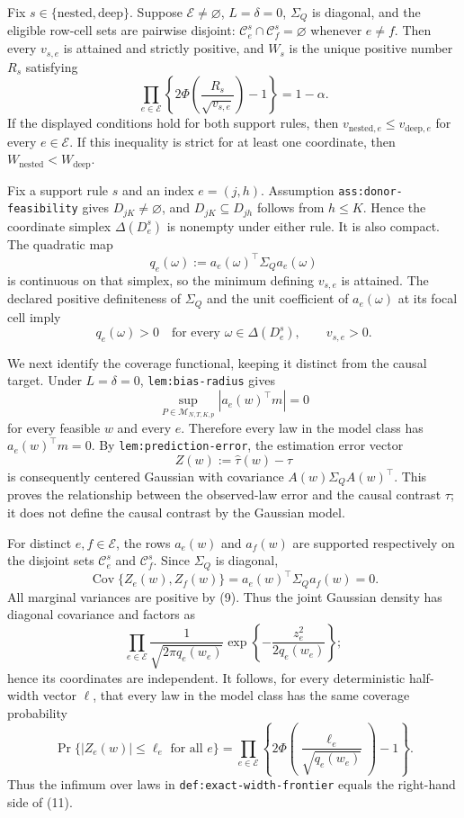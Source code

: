 Fix \(s\in\{\mathrm{nested},\mathrm{deep}\}\).  Suppose
\(\mathcal E\ne\varnothing\), \(L=\delta=0\), \(\Sigma_Q\) is diagonal, and
the eligible row-cell sets are pairwise disjoint:
\(\mathcal C^s_e\cap\mathcal C^s_f=\varnothing\) whenever \(e\ne f\).
Then every \(v_{s,e}\) is attained and strictly positive, and \(W_s\) is the
unique positive number \(R_s\) satisfying
\[
 \prod_{e\in\mathcal E}
 \left\{2\Phi\!\left(\frac{R_s}{\sqrt{v_{s,e}}}\right)-1\right\}
 =1-\alpha. \tag{8}
\]
If the displayed conditions hold for both support rules, then
\(v_{\mathrm{nested},e}\leq v_{\mathrm{deep},e}\) for every
\(e\in\mathcal E\).  If this inequality is strict for at least one
coordinate, then \(W_{\mathrm{nested}}<W_{\mathrm{deep}}\).

Fix a support rule \(s\) and an index \(e=(j,h)\).  Assumption
\texttt{ass:donor-feasibility} gives \(D_{jK}\ne\varnothing\), and
\(D_{jK}\subseteq D_{jh}\) follows from \(h\leq K\).  Hence the coordinate
simplex \(\Delta(D^s_e)\) is nonempty under either rule.  It is also compact.
The quadratic map
\[
 q_e(\omega):=a_e(\omega)^{\top}\Sigma_Qa_e(\omega)
\]
is continuous on that simplex, so the minimum defining \(v_{s,e}\) is
attained.  The declared positive definiteness of \(\Sigma_Q\) and the unit
coefficient of \(a_e(\omega)\) at its focal cell imply
\[
 q_e(\omega)>0
 \quad\text{for every }\omega\in\Delta(D^s_e),
 \qquad v_{s,e}>0. \tag{9}
\]

We next identify the coverage functional, keeping it distinct from the causal
target.  Under \(L=\delta=0\), \texttt{lem:bias-radius} gives
\[
 \sup_{P\in\mathcal M_{N,T,K,p}}
 |a_e(w)^{\top}m|=0
\]
for every feasible \(w\) and every \(e\).  Therefore every law in the model
class has \(a_e(w)^{\top}m=0\).  By
\texttt{lem:prediction-error}, the estimation error vector
\[
 Z(w):=\widehat\tau(w)-\tau
\]
is consequently centered Gaussian with covariance
\(A(w)\Sigma_QA(w)^{\top}\).  This proves the relationship between the
observed-law error and the causal contrast \(\tau\); it does not define the
causal contrast by the Gaussian model.

For distinct \(e,f\in\mathcal E\), the rows \(a_e(w)\) and \(a_f(w)\) are
supported respectively on the disjoint sets \(\mathcal C^s_e\) and
\(\mathcal C^s_f\).  Since \(\Sigma_Q\) is diagonal,
\[
 \operatorname{Cov}\{Z_e(w),Z_f(w)\}
 =a_e(w)^{\top}\Sigma_Qa_f(w)=0. \tag{10}
\]
All marginal variances are positive by (9).  Thus the joint Gaussian density
has diagonal covariance and factors as
\[
 \prod_{e\in\mathcal E}
 \frac{1}{\sqrt{2\pi q_e(w_e)}}
 \exp\!\left\{-\frac{z_e^2}{2q_e(w_e)}\right\};
\]
hence its coordinates are independent.  It follows, for every deterministic
half-width vector \(\ell\), that every law in the model class has the same
coverage probability
\[
 \Pr\{|Z_e(w)|\leq\ell_e\text{ for all }e\}
 =\prod_{e\in\mathcal E}
 \left\{2\Phi\!\left(\frac{\ell_e}{\sqrt{q_e(w_e)}}\right)-1\right\}.
 \tag{11}
\]
Thus the infimum over laws in \texttt{def:exact-width-frontier} equals the
right-hand side of (11).


